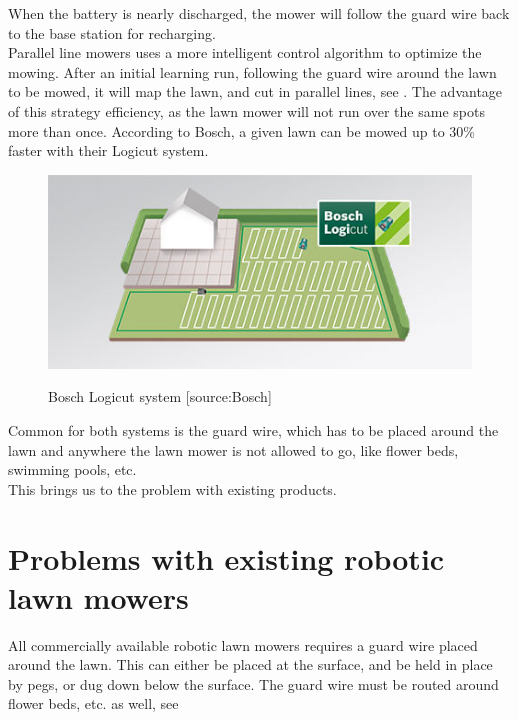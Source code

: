 \noindent
When the battery is nearly discharged, the mower will follow the guard wire back to the base station for recharging.\\

\noindent
Parallel line mowers uses a more intelligent control algorithm to optimize the mowing. After an initial learning run, following the guard wire around the lawn to be mowed, it will map the lawn, and cut in parallel lines, see . The advantage of this strategy efficiency, as the lawn mower will not run over the same spots more than once. According to Bosch, a given lawn can be mowed up to 30\% faster with their Logicut system.
 

\begin{figure}[H]
\centering
\includegraphics[scale=0.8]{figures/logicut.jpg} 
\label{fig:logicut}
\caption{Bosch Logicut system [source:Bosch]} 
\end{figure}

\noindent
Common for both systems is the guard wire, which has to be placed around the lawn and anywhere the lawn mower is not allowed to go, like flower beds, swimming pools, etc. \\

\noindent
This brings us to the problem with existing products.

\section{Problems with existing robotic lawn mowers}
All commercially available robotic lawn mowers requires a guard wire placed around the lawn. This can either be placed at the surface, and be held in place by pegs, or dug down below the surface. The guard wire must be routed around flower beds, etc. as well, see 

